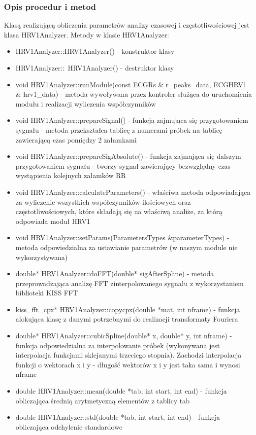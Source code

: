 \documentclass[a4paper, 11pt]{article}
\begin{document}
\subsubsection{Opis procedur i metod}
\label{sec:baseline:procs}
Klasą realizującą obliczenia parametrów analizy czasowej i częstotliwościowej jest klasa HRV1Analyzer.
Metody w klasie HRV1Analyzer:
\begin{itemize}
\item HRV1Analyzer::HRV1Analyzer() - konstruktor klasy
\item HRV1Analyzer::~HRV1Analyzer() - destruktor klasy
\item void HRV1Analyzer::runModule(const ECGRs \& r\_peaks\_data, ECGHRV1 \& hrv1\_data) - metoda wywoływana przez kontroler służąca do uruchomienia modułu i realizacji wyliczenia współczynników
\item void HRV1Analyzer::prepareSignal() - funkcja zajmująca się przygotowaniem sygnału - metoda przekształca tablicę z numerami próbek na tablicę zawierającą czas pomiędzy 2 załamkami
\item void HRV1Analyzer::prepareSigAbsolute() - funkcja zajmująca się dalszym przygotowaniem sygnału - tworzy sygnał zawierający bezwzględny czas wystąpienia kolejnych załamków RR
\item void HRV1Analyzer::calculateParameters() - właściwa metoda odpowiadająca za wyliczenie wszystkich współczynników ilościowych oraz częstotliwościowych, które składają się na właściwą analiże, za którą odpowiada moduł HRV1
\item void HRV1Analyzer::setParams(ParametersTypes \&parameterTypes) - metoda odpowiedzialna za ustawianie parametrów (w naszym module nie wykorzystywana)
\item double* HRV1Analyzer::doFFT(double* sigAfterSpline) - metoda przeprowadzająca analizę FFT zinterpolowanego sygnału z wykorzystaniem biblioteki KISS FFT
\item kiss\_fft\_cpx* HRV1Analyzer::copycpx(double *mat, int nframe) - funkcja alokująca klasę z danymi potrzebnymi do realizacji transformaty Fouriera
\item double* HRV1Analyzer::cubicSpline(double* x, double* y, int nframe) - funkcja odpowiedzialna za interpolowanie próbek (wykonywana jest interpolacja funkcjami sklejanymi trzeciego stopnia). Zachodzi interpolacja funkcji o wektorach x i y - długość wektorów x i y jest taka sama i wynosi nframe
\item double HRV1Analyzer::mean(double *tab, int start, int end) - funkcja obliczająca średnią arytmetyczną elementów z tablicy tab
\item double HRV1Analyzer::std(double *tab, int start, int end) - funkcja obliczająca odchylenie standardowe
\end{itemize}
\end{document}
